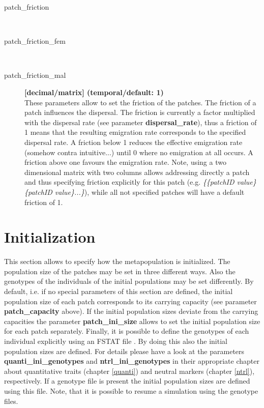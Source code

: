 \documentclass[letterpaper,12pt,oneside]{book}
\begin{document}
\begin{description}
\item[patch\_friction]\hspace*{\fill}\\
\vspace{-9mm}
\item[patch\_friction\_fem]\hspace*{\fill}\\
\vspace{-9mm}
\item[patch\_friction\_mal]\textbf{[decimal/matrix] (temporal/default: 1)}\\
These parameters allow to set the friction of the patches. The friction of a patch influences the dispersal. The friction is currently a factor multiplied with the dispersal rate (see parameter \textbf{dispersal\_rate}), thus a friction of 1 means that the resulting emigration rate corresponds to the specified dispersal rate. A friction below 1 reduces the effective emigration rate (somehow contra intuitive...) until 0 where no emigration at all occurs. A friction above one favours the emigration rate. Note, using a two dimensional matrix with two columns allows addressing directly a patch and thus specifying friction explicitly for this patch (e.g. \textit{\{\{patchID value\}\{patchID value\}...\}}), while all not specified patches will have a default friction of 1.   
\end{description}


\section{Initialization}
This section allows to specify how the metapopulation is initialized. The population size of the patches may be set in three different ways. Also the genotypes of the individuals of the initial populations may be set differently. By default, i.e. if no special parameters of this section are defined, the initial population size of each patch corresponds to its carrying capacity (see parameter \textbf{patch\_capacity} above). If the initial population sizes deviate from the carrying capacities the parameter \textbf{patch\_ini\_size} allows to set the initial population size for each patch separately. Finally, it is possible to define the genotypes of each individual explicitly using an FSTAT file \citep{Goudet_1995}. By doing this also the initial population sizes are defined. For details please have a look at the parameters \textbf{quanti\_ini\_genotypes} and \textbf{ntrl\_ini\_genotypes} in their appropriate chapter about quantitative traits (chapter \ref{quanti}) and neutral markers (chapter \ref{ntrl}), respectively. If a genotype file is present the initial population sizes are defined using this file. Note, that it is possible to resume a simulation using the genotype files.    
\end{document}
